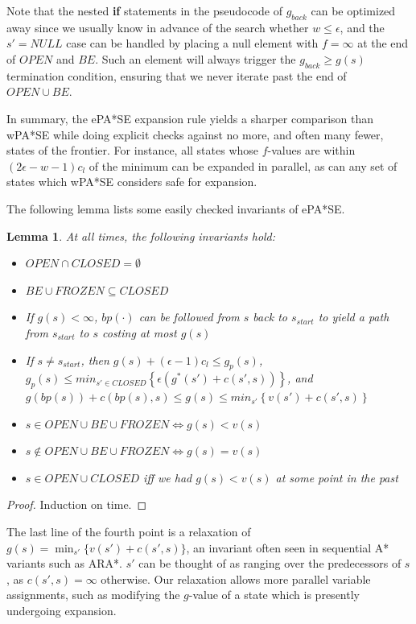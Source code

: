 \documentclass[letterpaper]{article}
\newtheorem{lemma}{Lemma}
\begin{document}
Note that the nested \textbf{if} statements in the pseudocode of $g_{back}$ can be optimized away since we usually know in advance of the search whether $w \le \epsilon$, and the $s' = NULL$ case can be handled by placing a null element with $f = \infty$ at the end of $OPEN$ and $BE$. Such an element will always trigger the $g_{back} \ge g(s)$ termination condition, ensuring that we never iterate past the end of $OPEN\cup BE$.

In summary, the ePA*SE expansion rule yields a sharper comparison than wPA*SE while doing explicit checks against no more, and often many fewer, states of the frontier. For instance, all states whose $f$-values are within $(2\epsilon-w-1)c_l$ of the minimum can be expanded in parallel, as can any set of states which wPA*SE considers safe for expansion.

The following lemma lists some easily checked invariants of ePA*SE.

\begin{lemma}
\label{lem:prop}
At all times, the following invariants hold:
\begin{itemize}
\item $OPEN\cap CLOSED = \emptyset$
\item $BE\cup FROZEN \subseteq CLOSED$
\item If $g(s)<\infty$, $bp(\cdot)$ can be followed from $s$ back to $s_{start}$ to yield a path from $s_{start}$ to $s$ costing at most $g(s)$
\item If $s\ne s_{start}$, then $g(s) + (\epsilon-1)c_l \le g_p(s)$,
\\$g_p(s) \le min_{s'\in CLOSED}\left\{\epsilon (g^*(s') + c(s',s))\right\}$, and
\\$g(bp(s)) + c(bp(s),s) \le g(s) \le min_{s'}\left\{v(s') + c(s',s)\right\}$
\item $s\in OPEN\cup BE\cup FROZEN \Leftrightarrow g(s) < v(s)$
\item $s\notin OPEN\cup BE\cup FROZEN \Leftrightarrow g(s) = v(s)$
\item $s\in OPEN\cup CLOSED$ iff we had $g(s)<v(s)$ at some point in the past
\end{itemize}
\end{lemma}

\begin{proof}
Induction on time.
\end{proof}

The last line of the fourth point is a relaxation of $g(s) = \min_{s'}\{v(s') + c(s',s)\}$, an invariant often seen in sequential A* variants such as ARA*. $s'$ can be thought of as ranging over the predecessors of $s$, as $c(s',s)=\infty$ otherwise. Our relaxation allows more parallel variable assignments, such as modifying the $g$-value of a state which is presently undergoing expansion.
\end{document}
